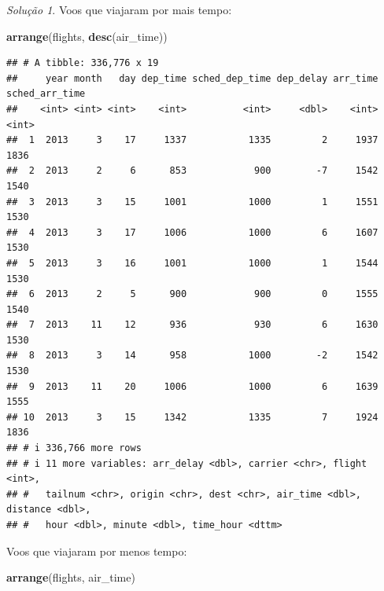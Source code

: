 \documentclass[
]{latex/krantz}
\newenvironment{Shaded}{\begin{snugshade}}{\end{snugshade}}
\newcommand{\FunctionTok}[1]{\textcolor[rgb]{0.13,0.29,0.53}{\textbf{#1}}}
\newcommand{\NormalTok}[1]{#1}
\theoremstyle{definition}
\theoremstyle{definition}
\theoremstyle{definition}
\theoremstyle{definition}
\theoremstyle{remark}
\newtheorem*{solution}{Solução}
\begin{document}
\begin{solution}

Voos que viajaram por mais tempo:

\begin{Shaded}
\begin{Highlighting}[]
\FunctionTok{arrange}\NormalTok{(flights, }\FunctionTok{desc}\NormalTok{(air\_time))}
\end{Highlighting}
\end{Shaded}

\begin{verbatim}
## # A tibble: 336,776 x 19
##     year month   day dep_time sched_dep_time dep_delay arr_time sched_arr_time
##    <int> <int> <int>    <int>          <int>     <dbl>    <int>          <int>
##  1  2013     3    17     1337           1335         2     1937           1836
##  2  2013     2     6      853            900        -7     1542           1540
##  3  2013     3    15     1001           1000         1     1551           1530
##  4  2013     3    17     1006           1000         6     1607           1530
##  5  2013     3    16     1001           1000         1     1544           1530
##  6  2013     2     5      900            900         0     1555           1540
##  7  2013    11    12      936            930         6     1630           1530
##  8  2013     3    14      958           1000        -2     1542           1530
##  9  2013    11    20     1006           1000         6     1639           1555
## 10  2013     3    15     1342           1335         7     1924           1836
## # i 336,766 more rows
## # i 11 more variables: arr_delay <dbl>, carrier <chr>, flight <int>,
## #   tailnum <chr>, origin <chr>, dest <chr>, air_time <dbl>, distance <dbl>,
## #   hour <dbl>, minute <dbl>, time_hour <dttm>
\end{verbatim}

Voos que viajaram por menos tempo:

\begin{Shaded}
\begin{Highlighting}[]
\FunctionTok{arrange}\NormalTok{(flights, air\_time)}
\end{Highlighting}
\end{Shaded}


\end{solution}
\end{document}
